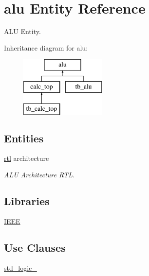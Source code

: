 \hypertarget{classalu}{}\section{alu Entity Reference}
\label{classalu}


A\+LU Entity.  


Inheritance diagram for alu\+:\begin{figure}[H]
\begin{center}
\leavevmode
\includegraphics[height=3.000000cm]{classalu}
\end{center}
\end{figure}
\subsection*{Entities}
\begin{DoxyCompactItemize}
\item 
\hyperlink{classalu_1_1rtl}{rtl} architecture
\begin{DoxyCompactList}\small\item\em A\+LU Architecture R\+TL. \end{DoxyCompactList}\end{DoxyCompactItemize}
\subsection*{Libraries}
 \begin{DoxyCompactItemize}
\item 
\hyperlink{classalu_ae4f03c286607f3181e16b9aa12d0c6d4}{I\+E\+EE} 
\end{DoxyCompactItemize}
\subsection*{Use Clauses}
 \begin{DoxyCompactItemize}
\item 
\hyperlink{classalu_acd03516902501cd1c7296a98e22c6fcb}{std\+\_\+logic\+\_}   
\end{DoxyCompactItemize}
